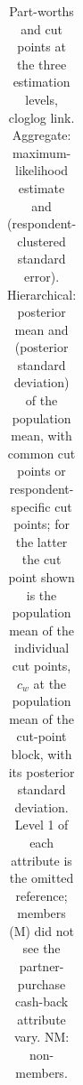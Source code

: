 \documentclass[
  letterpaper,
  DIV=11,
  numbers=noendperiod]{scrartcl}
\theoremstyle{plain}
\theoremstyle{plain}
\theoremstyle{plain}
\theoremstyle{remark}
\begin{document}
\begin{longtable}[]{@{}
  >{\raggedright\arraybackslash}p{}
  >{\raggedleft\arraybackslash}p{}
  >{\raggedleft\arraybackslash}p{}
  >{\raggedleft\arraybackslash}p{}
  >{\raggedleft\arraybackslash}p{}
  >{\raggedleft\arraybackslash}p{}
  >{\raggedleft\arraybackslash}p{}@{}}

\caption{\label{tbl-emp-partworths}Part-worths and cut points at the
three estimation levels, cloglog link. Aggregate: maximum-likelihood
estimate and (respondent-clustered standard error). Hierarchical:
posterior mean and (posterior standard deviation) of the population
mean, with common cut points or respondent-specific cut points; for the
latter the cut point shown is the population mean of the individual cut
points, \(c_w\) at the population mean of the cut-point block, with its
posterior standard deviation. Level 1 of each attribute is the omitted
reference; members (M) did not see the partner-purchase cash-back
attribute vary. NM: non-members.}

\tabularnewline


\end{longtable}
\end{document}
